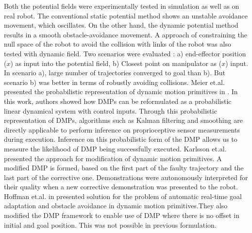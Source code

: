 Both the potential fields were experimentally tested in simulation as well as on real robot.  
The conventional static potential method shows an unstable avoidance movement, which oscillates. On the other hand, the dynamic potential method results in a smooth obstacle-avoidance movement.
A approach of constraining the null space of the robot to avoid the collision with links of the robot was also tested with dynamic field. Two scenarios were evaluated : a) end-effector position ($x$) as input into the potential field, b) Closest point on manipulator as ($x$) input. In scenario a), large number of trajectories converged to goal than b). But scenario b) was better in terms of robustly avoiding collisions.  
\newline
Meier et.al. presented the probabilistic representation of dynamic motion primitives in \cite{meier2016probabilistic}. In this work, authors showed how DMPs can be reformulated as a probabilistic linear dynamical system with control inputs. Through this probabilistic representation of DMPs, algorithms such as Kalman filtering and smoothing are directly applicable to perform inference on proprioceptive sensor measurements during execution. Inference on this probabilistic form of the DMP allows us to measure the likelihood of DMP being successfully executed. 
\newline
Karlsson et.al.\cite{karlsson2017autonomous} presented the approach for modification of dynamic motion primitives. A modified DMP is formed, based on the first part of the faulty trajectory and the last part of the corrective one. Demonstrations were autonomously interpreted for their quality when a new corrective demonstration was presented to the robot. 
\newline
Hoffman et.al. in \cite{hoffmann2009biologically} presented solution for the problem of automatic real-time goal adaptation and obstacle avoidance in dynamic motion primitives.They also modified the DMP framework to enable use of DMP where there is no offset in initial and goal position. This was not possible in previous formulation.


